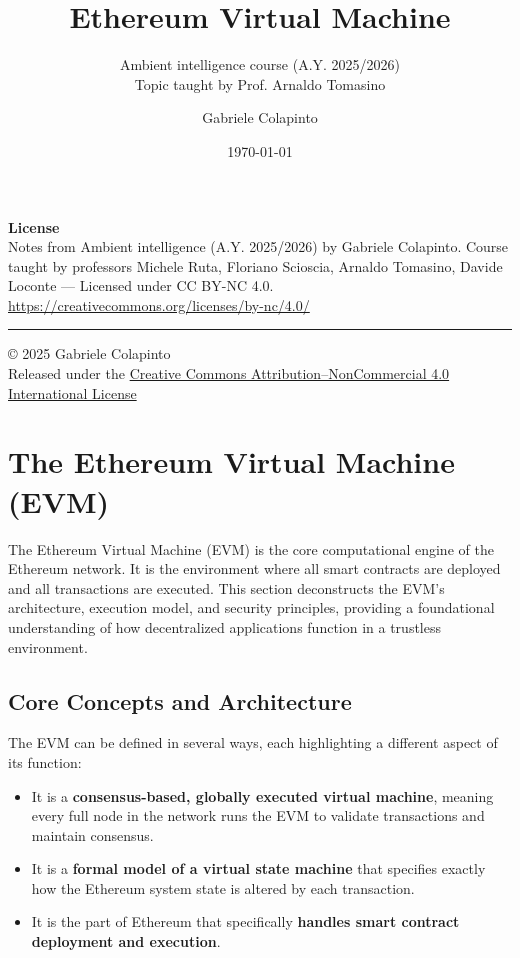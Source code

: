 \documentclass{scrbook}
\title{Ethereum Virtual Machine}
\subtitle{Ambient intelligence course (A.Y. 2025/2026)\\Topic taught by Prof. Arnaldo Tomasino}
\author{Gabriele Colapinto}
\date{\today}
\begin{document}
\maketitle
\thispagestyle{empty}

{\Large\textbf{License}} \\
{Notes from Ambient intelligence (A.Y. 2025/2026) by Gabriele Colapinto. 
Course taught by professors Michele Ruta, Floriano Scioscia, Arnaldo Tomasino, Davide Loconte — 
Licensed under CC BY-NC 4.0.\\
\url{https://creativecommons.org/licenses/by-nc/4.0/}}

\vspace*{\fill}
\rule{\textwidth}{0.2pt}
\small{© 2025 Gabriele Colapinto \\
Released under the \href{https://creativecommons.org/licenses/by-nc/4.0/}{Creative Commons Attribution–NonCommercial 4.0 International License}}

\clearpage

\tableofcontents

\chapter{The Ethereum Virtual Machine (EVM)}

The Ethereum Virtual Machine (EVM) is the core computational engine of the Ethereum network. It is the environment where all smart contracts are deployed and all transactions are executed. This section deconstructs the EVM's architecture, execution model, and security principles, providing a foundational understanding of how decentralized applications function in a trustless environment.

\section{Core Concepts and Architecture}

The EVM can be defined in several ways, each highlighting a different aspect of its function:

\begin{itemize}
    \item It is a \textbf{consensus-based, globally executed virtual machine}, meaning every full node in the network runs the EVM to validate transactions and maintain consensus.
    
    \item It is a \textbf{formal model of a virtual state machine} that specifies exactly how the Ethereum system state is altered by each transaction.
    
    \item It is the part of Ethereum that specifically \textbf{handles smart contract deployment and execution}.
\end{itemize}
\end{document}
